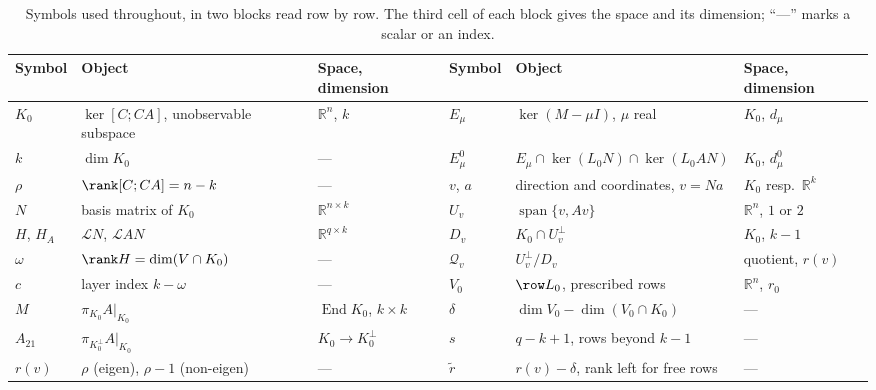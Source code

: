 \begin{table}[t]
\centering
\caption{Symbols used throughout, in two blocks read row by row. The third cell of each block gives
the space and its dimension; ``---'' marks a scalar or an index.}
\label{tab:notation}
\small
\begin{tabular}{@{}llllll@{}}
\toprule
Symbol & Object & Space, dimension & Symbol & Object & Space, dimension \\
\midrule
$K_0$ & $\ker[C;CA]$, unobservable subspace & $\mathbb R^n$, $k$ &
$E_\mu$ & $\ker(M-\mu I)$, $\mu$ real & $K_0$, $d_\mu$ \\
$k$ & $\dim K_0$ & --- &
$E_\mu^0$ & $E_\mu\cap\ker(L_0N)\cap\ker(L_0AN)$ & $K_0$, $d_\mu^0$ \\
$\rho$ & $\rank[C;CA]=n-k$ & --- &
$v$, $a$ & direction and coordinates, $v=Na$ & $K_0$ resp.\ $\mathbb R^k$ \\
$N$ & basis matrix of $K_0$ & $\mathbb R^{n\times k}$ &
$U_v$ & $\operatorname{span}\{v,Av\}$ & $\mathbb R^n$, $1$ or $2$ \\
$H$, $H_A$ & $\mathcal LN$, $\mathcal LAN$ & $\mathbb R^{q\times k}$ &
$D_v$ & $K_0\cap U_v^\perp$ & $K_0$, $k-1$ \\
$\omega$ & $\rank H=\dim(V\cap K_0)$ & --- &
$\mathcal Q_v$ & $U_v^\perp/D_v$ & quotient, $r(v)$ \\
$c$ & layer index $k-\omega$ & --- &
$V_0$ & $\row L_0$, prescribed rows & $\mathbb R^n$, $r_0$ \\
$M$ & $\pi_{K_0}A|_{K_0}$ & $\operatorname{End}K_0$, $k\times k$ &
$\delta$ & $\dim V_0-\dim(V_0\cap K_0)$ & --- \\
$A_{21}$ & $\pi_{K_0^\perp}A|_{K_0}$ & $K_0\to K_0^\perp$ &
$s$ & $q-k+1$, rows beyond $k-1$ & --- \\
$r(v)$ & $\rho$ (eigen), $\rho-1$ (non-eigen) & --- &
$\widetilde r$ & $r(v)-\delta$, rank left for free rows & --- \\
\bottomrule
\end{tabular}
\end{table}
